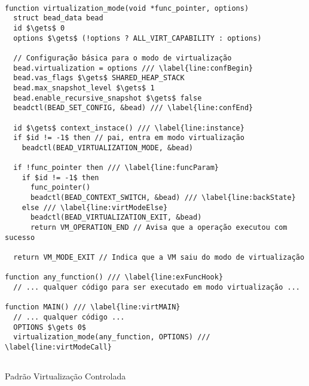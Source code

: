\begin{pseudocode}
\begin{lstlisting}[language=pseudocode, style=pseudocode]

function virtualization_mode(void *func_pointer, options)
  struct bead_data bead
  id $\gets$ 0
  options $\gets$ (!options ? ALL_VIRT_CAPABILITY : options)

  // Configuração básica para o modo de virtualização
  bead.virtualization = options /// \label{line:confBegin}
  bead.vas_flags $\gets$ SHARED_HEAP_STACK
  bead.max_snapshot_level $\gets$ 1
  bead.enable_recursive_snapshot $\gets$ false
  beadctl(BEAD_SET_CONFIG, &bead) /// \label{line:confEnd}

  id $\gets$ context_instace() /// \label{line:instance}
  if $id != -1$ then // pai, entra em modo virtualização
    beadctl(BEAD_VIRTUALIZATION_MODE, &bead)

  if !func_pointer then /// \label{line:funcParam}
    if $id != -1$ then
      func_pointer()
      beadctl(BEAD_CONTEXT_SWITCH, &bead) /// \label{line:backState}
    else /// \label{line:virtModeElse}
      beadctl(BEAD_VIRTUALIZATION_EXIT, &bead)
      return VM_OPERATION_END // Avisa que a operação executou com sucesso

  return VM_MODE_EXIT // Indica que a VM saiu do modo de virtualização

function any_function() /// \label{line:exFuncHook}
  // ... qualquer código para ser executado em modo virtualização ...      

function MAIN() /// \label{line:virtMAIN}
  // ... qualquer código ...
  OPTIONS $\gets 0$
  virtualization_mode(any_function, OPTIONS) /// \label{line:virtModeCall}
  
\end{lstlisting}

  \caption{Padrão Virtualização Controlada}
  \label{alg:virtMode}
\end{pseudocode}
